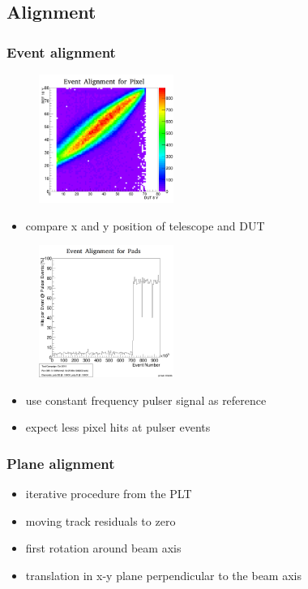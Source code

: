 \documentclass[9pt]{beamer}
\begin{document}
\subsection{Alignment}
\begin{frame}
	\frametitle{Event alignment}
	\begin{center}
		\begin{minipage}{5.5cm}
			\centering
			\begin{figure}
				\includegraphics[width=4.4cm]{Pics/correlation2y}
			\end{figure}
			\begin{itemize}
				\item compare x and y position of telescope and DUT
			\end{itemize}
		\end{minipage}
		\hspace*{2pt}
		\begin{minipage}{5.5cm}
			\centering
			\begin{figure}
				\includegraphics[width=4.4cm]{Pics/EventAlignment}
			\end{figure}
			\begin{itemize}
				\item use constant frequency pulser signal as reference
				\item expect less pixel hits at pulser events
			\end{itemize}
		\end{minipage}
	\end{center}
\end{frame}
\begin{frame}
	\frametitle{Plane alignment}
	\begin{minipage}[c][.4\textheight]{\textwidth}
		\begin{itemize}
			\setlength{\itemsep}{\fill}
			\item iterative procedure from the PLT
			\item moving track residuals to zero
			\item first rotation around beam axis
			\item translation in x-y plane perpendicular to the beam axis
		\end{itemize}

	\end{minipage}

\end{frame}
\end{document}
